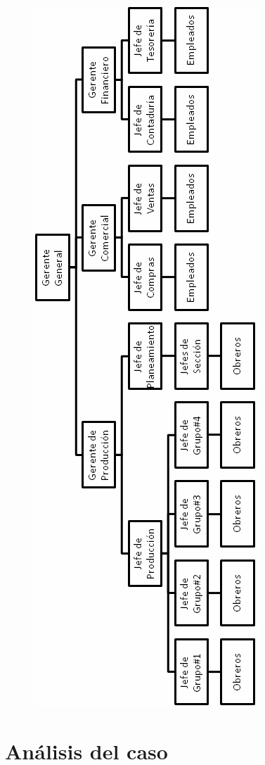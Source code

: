 \documentclass[12pt,a4paper,spanish]{article}
\begin{document}
\begin{figure}[H]
\centering
\includegraphics[scale=0.75]{organigrama.png}
\end{figure}

\newpage
\section{An\'{a}lisis del caso}
\end{document}
